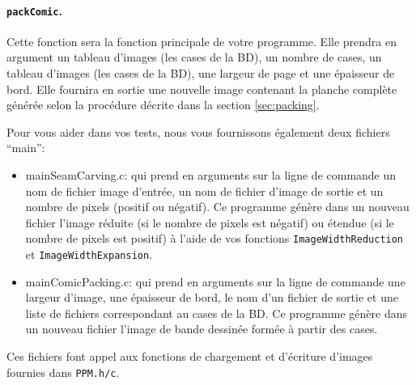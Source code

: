 \documentclass[a4paper,10pt]{article}
\begin{document}
\paragraph{\texttt{packComic}.} Cette fonction sera la fonction  principale de
votre programme. Elle prendra en argument un tableau d'images (les cases de la
BD), un nombre de cases, un tableau d'images (les cases de la BD), une largeur
de page et une épaisseur de bord. Elle fournira en sortie une nouvelle image
contenant la planche complète générée selon la procédure décrite dans la
section \ref{sec:packing}.

Pour vous aider dans vos tests, nous vous fournissons également deux
fichiers ``main'':
\begin{itemize}
\item mainSeamCarving.c: qui prend en arguments sur la ligne de
  commande un nom de fichier image d'entrée, un nom de fichier d'image de sortie et un nombre de pixels (positif ou
  négatif). Ce programme génère dans un nouveau fichier l'image réduite (si le nombre
  de pixels est négatif) ou étendue (si le nombre de pixels est
  positif) à l'aide de vos fonctions \texttt{ImageWidthReduction} et
  \texttt{ImageWidthExpansion}.
\item mainComicPacking.c: qui prend en arguments sur la ligne de
  commande une largeur d'image, une épaisseur de bord, le nom d'un fichier de
  sortie et une liste de fichiers correspondant au cases de la BD. Ce
  programme génère dans un nouveau fichier l'image de bande dessinée
  formée à partir des cases.
\end{itemize}
Ces fichiers font appel aux fonctions de chargement et d'écriture d'images fournies dans \texttt{PPM.h/c}.


\end{document}
